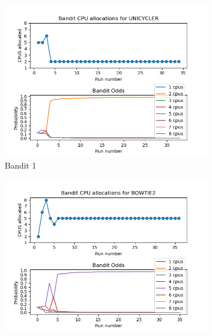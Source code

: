\begin{figure}[ht]
\centering
\begin{subfigure}{.5\textwidth}
  \includegraphics[width=1.1\textwidth,height=1.1\textwidth]{fig/old_UNICYCLER.png}
  \caption{Bandit 1}
  \label{fig:sub1}
\end{subfigure}%
\begin{subfigure}{.5\textwidth}
  \includegraphics[width=1.1\textwidth,height=1.1\textwidth]{fig/old_BOWTIE2.png}

\end{subfigure}
\end{figure}
